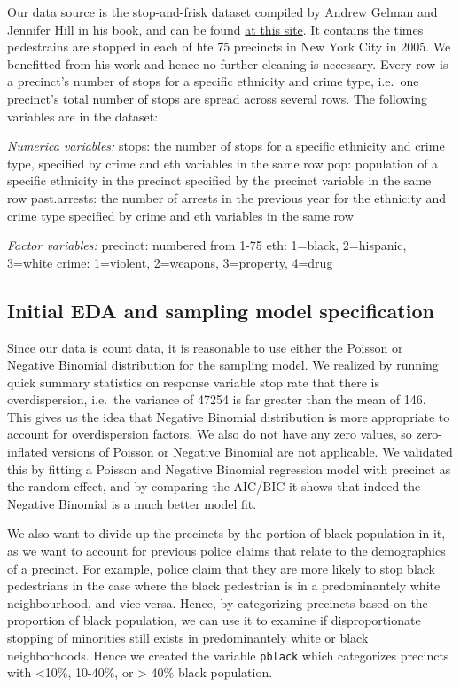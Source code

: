 \documentclass[]{article}
\begin{document}
Our data source is the stop-and-frisk dataset compiled by Andrew Gelman
and Jennifer Hill in his book, and can be found
\href{http://www.stat.columbia.edu/~gelman/arm/examples/police/frisk_with_noise.dat}{at
this site}. It contains the times pedestrains are stopped in each of hte
75 precincts in New York City in 2005. We benefitted from his work and
hence no further cleaning is necessary. Every row is a precinct's number
of stops for a specific ethnicity and crime type, i.e.~one precinct's
total number of stops are spread across several rows. The following
variables are in the dataset:

\emph{Numerica variables:} stops: the number of stops for a specific
ethnicity and crime type, specified by crime and eth variables in the
same row pop: population of a specific ethnicity in the precinct
specified by the precinct variable in the same row past.arrests: the
number of arrests in the previous year for the ethnicity and crime type
specified by crime and eth variables in the same row

\emph{Factor variables:} precinct: numbered from 1-75 eth: 1=black,
2=hispanic, 3=white crime: 1=violent, 2=weapons, 3=property, 4=drug

\hypertarget{initial-eda-and-sampling-model-specification}{%
\subsection{Initial EDA and sampling model
specification}\label{initial-eda-and-sampling-model-specification}}

Since our data is count data, it is reasonable to use either the Poisson
or Negative Binomial distribution for the sampling model. We realized by
running quick summary statistics on response variable stop rate that
there is overdispersion, i.e.~the variance of 47254 is far greater than
the mean of 146. This gives us the idea that Negative Binomial
distribution is more appropriate to account for overdispersion factors.
We also do not have any zero values, so zero-inflated versions of
Poisson or Negative Binomial are not applicable. We validated this by
fitting a Poisson and Negative Binomial regression model with precinct
as the random effect, and by comparing the AIC/BIC it shows that indeed
the Negative Binomial is a much better model fit.

We also want to divide up the precincts by the portion of black
population in it, as we want to account for previous police claims that
relate to the demographics of a precinct. For example, police claim that
they are more likely to stop black pedestrians in the case where the
black pedestrian is in a predominantely white neighbourhood, and vice
versa. Hence, by categorizing precincts based on the proportion of black
population, we can use it to examine if disproportionate stopping of
minorities still exists in predominantely white or black neighborhoods.
Hence we created the variable \texttt{pblack} which categorizes
precincts with \textless{}10\%, 10-40\%, or \textgreater{} 40\% black
population.
\end{document}
